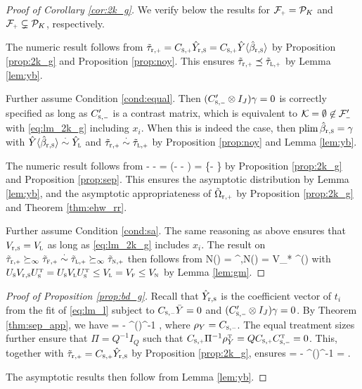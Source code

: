 \documentclass[11pt]{article}
\theoremstyle{definition}
\begin{document}
\begin{proof}[Proof of Corollary \ref{cor:2k_g}]
We verify below the results for $\mfp = \pk$ and $\mfp \subsetneq \pk$, respectively. 

The numeric result follows from 
$
\ttrp  = \csp \hyrs = \csp \hybrs
$
by  Proposition \ref{prop:2k_g} and Proposition \ref{prop:noy}.
This ensures $\ttrp \preceq \ttlp$  by Lemma \ref{lem:yb}. 

Further assume 
Condition \ref{cond:equal}. 
Then $(\csm' \otimes I_J)\gamma = 0$ is correctly specified as long as $\csm' $ is a contrast matrix, which is equivalent to $\mk = \emptyset \not\in \mfm'$ with \eqref{eq:lm_2k_g} including $x_i$.
 When this is indeed the case,  then $\textup{plim\,}  \hat\beta_{\textup{r},{\textsc{s}}}  = \gamma$ with $\hat Y\langle\hat\beta_{\textup{r},{\textsc{s}}}\rangle \overset{\cdot}{\sim} \hat Y_{\textsc{l}}$ and $\ttrp \asim \ttlp$ by Proposition \ref{prop:noy} and Lemma \ref{lem:yb}. 
 
The numeric result follows from 
\begina
\ttrp - \tsp - \csp \murs = \csp (\hyrs - \by - \murs) = \csp  \us \{\hybrs  - \by\}
\enda
by Proposition \ref{prop:2k_g} and Proposition \ref{prop:sep}. This ensures the asymptotic distribution by Lemma \ref{lem:yb}, and the asymptotic appropriateness of $\torp$ by Proposition \ref{prop:2k_g} and Theorem \ref{thm:ehw_rr}. 

Further assume Condition \ref{cond:sa}. The same reasoning as above ensures that $V_{\textup{r},{\textsc{s}}} = V_{\textsc{l}}$ as long as \eqref{eq:lm_2k_g} includes $x_i$.
The result on $\ttrp \succi \ttfp \asim \ttlp \succi \ttnp$ then follows from 
\begina
N\covi(\ttrp) = 
\csp \us\vrrs \ust  \csp^\T,\qquad N\covi(\ttsp) = \csp V_* \csp^\T \qquad  (\nfl)
\enda
with 
$U_{\textsc{s}}V_{\textup{r},{\textsc{s}}} U_{\textsc{s}}^{ \mathrm{\scriptscriptstyle T} } = U_{\textsc{s}} V_{\textsc{l}}  U_{\textsc{s}}^{ \mathrm{\scriptscriptstyle T} } \leq V_{\textsc{l}} = V_{\textsc{f}} \leq V_{\textsc{n}}$ by Lemma \ref{lem:gm}. 

\end{proof} 

 \begin{proof}[Proof of Proposition \ref{prop:bd_g}]
Recall that $\hat Y_{\textup{r},{\textsc{s}}} $ is the coefficient vector of $t_i$ from the \rolss fit of  \eqref{eq:lm_l} subject to  $\csm \by= 0$ and $(\csm' \otimes I_J)\gamma = 0$.
By Theorem \ref{thm:sep_app}, we have
\begina
\hyrs   = \hybrs    -  \einv \rhy^\T   (\rhy \einv \rhyt)^{-1} \rhy\hybrs, 
\enda
where $\rhy = \csm$. 
The equal treatment sizes further ensure that $\Pi = Q^{-1}I_Q$ such that $\csp \einv \rho_Y^\T = Q \csp   \csm^\T =0$. 
This, together with $\ttrp   =  \csp\hyrs $ by Proposition \ref{prop:2k_g}, ensures
\begina
\ttrp     = \csp \hybrs - \csp\einv \rhy^\T   (\rhy \einv \rhyt)^{-1} \rhy\hybrs  =  \csp \hybrs.
\enda 

The asymptotic results then follow from Lemma \ref{lem:yb}. 
\end{proof}
\end{document}
